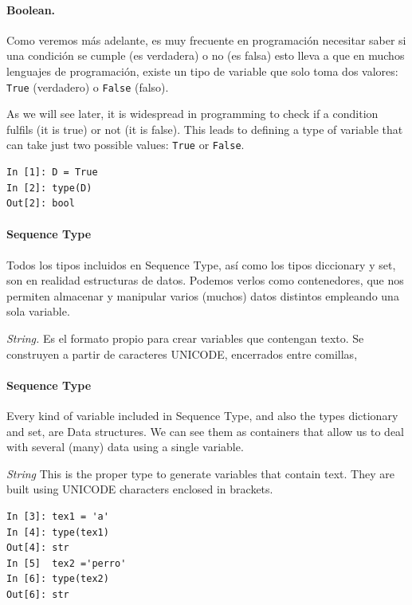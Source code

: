 \begin{paracol}{2}
\paragraph{Boolean.} Como veremos más adelante, es muy frecuente en programación necesitar saber si una condición se cumple (es verdadera) o no (es falsa) esto lleva a que en muchos lenguajes de programación, existe un tipo de variable que solo toma dos valores: \texttt{True} (verdadero)  o \texttt{False} (falso).

\switchcolumn
As we will see later, it is widespread in programming to check if a condition fulfils (it is true) or not (it is false). This leads to defining a type of variable that can take just two possible values:  \texttt{True} or \texttt{False}. 
\end{paracol}
\begin{center}
    \begin{minipage}{0.2\textwidth}
\begin{verbatim}
In [1]: D = True
In [2]: type(D)
Out[2]: bool
\end{verbatim}
\end{minipage}\end{center}

\begin{paracol}{2}
\paragraph{Sequence Type}
    Todos los tipos incluidos en Sequence Type, así como los tipos diccionary y set, son en realidad estructuras de datos. Podemos verlos como contenedores, que nos permiten almacenar y manipular varios (muchos) datos distintos empleando una sola variable.
         
         \emph{String.} Es el formato propio para crear variables que contengan texto. Se construyen a partir de caracteres UNICODE, encerrados entre comillas,

\switchcolumn
\paragraph{Sequence Type} Every kind of variable included in Sequence Type, and also the types dictionary and set, are Data structures. We can see them as containers that allow us to deal with several (many) data using a single variable.

\emph{String} This is the proper type to generate variables that contain text. They are built using UNICODE characters enclosed in brackets.

\end{paracol}
\begin{center}
\begin{minipage}{0.2\textwidth}
\begin{verbatim}
In [3]: tex1 = 'a'
In [4]: type(tex1)
Out[4]: str
In [5]  tex2 ='perro'
In [6]: type(tex2)
Out[6]: str
\end{verbatim}
\end{minipage}
\end{center}

